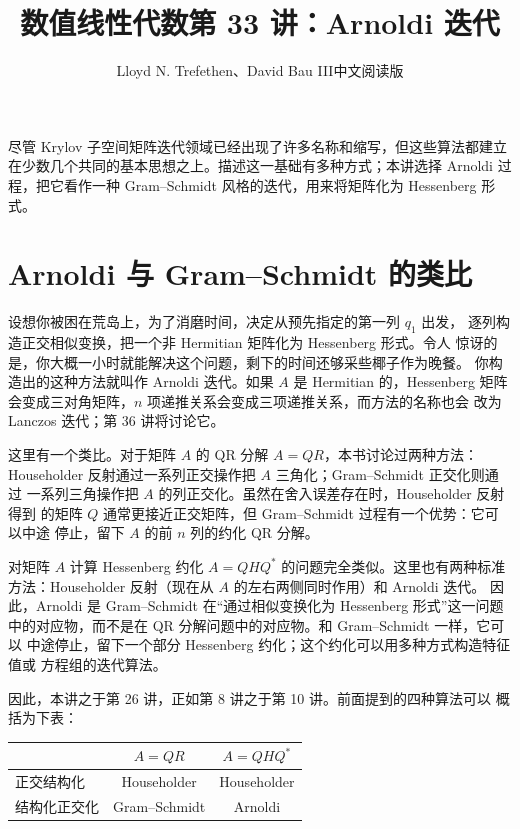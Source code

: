 \documentclass[UTF8,fontset=none,12pt]{ctexart}
\title{数值线性代数\quad 第 33 讲：Arnoldi 迭代}
\author{Lloyd N. Trefethen、David Bau III\quad 中文阅读版}
\date{}
\begin{document}
\maketitle
\pagestyle{plain}

尽管 Krylov 子空间矩阵迭代领域已经出现了许多名称和缩写，但这些算法都建立
在少数几个共同的基本思想之上。描述这一基础有多种方式；本讲选择 Arnoldi
过程，把它看作一种 Gram--Schmidt 风格的迭代，用来将矩阵化为 Hessenberg 形式。

\section*{Arnoldi 与 Gram--Schmidt 的类比}

设想你被困在荒岛上，为了消磨时间，决定从预先指定的第一列 $q_1$ 出发，
逐列构造正交相似变换，把一个非 Hermitian 矩阵化为 Hessenberg 形式。令人
惊讶的是，你大概一小时就能解决这个问题，剩下的时间还够采些椰子作为晚餐。
你构造出的这种方法就叫作 Arnoldi 迭代。如果 $A$ 是 Hermitian 的，Hessenberg
矩阵会变成三对角矩阵，$n$ 项递推关系会变成三项递推关系，而方法的名称也会
改为 Lanczos 迭代；第 36 讲将讨论它。

这里有一个类比。对于矩阵 $A$ 的 QR 分解 $A=QR$，本书讨论过两种方法：
Householder 反射通过一系列正交操作把 $A$ 三角化；Gram--Schmidt 正交化则通过
一系列三角操作把 $A$ 的列正交化。虽然在舍入误差存在时，Householder 反射得到
的矩阵 $Q$ 通常更接近正交矩阵，但 Gram--Schmidt 过程有一个优势：它可以中途
停止，留下 $A$ 的前 $n$ 列的约化 QR 分解。

对矩阵 $A$ 计算 Hessenberg 约化 $A=QHQ^*$ 的问题完全类似。这里也有两种标准
方法：Householder 反射（现在从 $A$ 的左右两侧同时作用）和 Arnoldi 迭代。
因此，Arnoldi 是 Gram--Schmidt 在“通过相似变换化为 Hessenberg 形式”这一问题
中的对应物，而不是在 QR 分解问题中的对应物。和 Gram--Schmidt 一样，它可以
中途停止，留下一个部分 Hessenberg 约化；这个约化可以用多种方式构造特征值或
方程组的迭代算法。

因此，本讲之于第 26 讲，正如第 8 讲之于第 10 讲。前面提到的四种算法可以
概括为下表：

\begin{center}
\renewcommand{\arraystretch}{1.45}
\begin{tabular}{>{\centering\arraybackslash}m{3.9cm}|c|c}
 & $A=QR$ & $A=QHQ^*$\\
\hline
正交结构化 & Householder & Householder\\
结构化正交化 & Gram--Schmidt & Arnoldi
\end{tabular}
\end{center}
\end{document}
